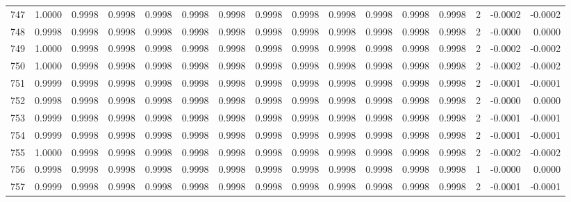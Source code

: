 \begin{tabular}{lrrrrrrrrrrrrrrr}
747 &      1.0000 &  0.9998 &  0.9998 &  0.9998 &  0.9998 &  0.9998 &  0.9998 &  0.9998 &  0.9998 &  0.9998 &   0.9998 &     0.9998 &      2 &                   -0.0002 &                    -0.0002 \\
748 &      0.9998 &  0.9998 &  0.9998 &  0.9998 &  0.9998 &  0.9998 &  0.9998 &  0.9998 &  0.9998 &  0.9998 &   0.9998 &     0.9998 &      2 &                   -0.0000 &                     0.0000 \\
749 &      1.0000 &  0.9998 &  0.9998 &  0.9998 &  0.9998 &  0.9998 &  0.9998 &  0.9998 &  0.9998 &  0.9998 &   0.9998 &     0.9998 &      2 &                   -0.0002 &                    -0.0002 \\
750 &      1.0000 &  0.9998 &  0.9998 &  0.9998 &  0.9998 &  0.9998 &  0.9998 &  0.9998 &  0.9998 &  0.9998 &   0.9998 &     0.9998 &      2 &                   -0.0002 &                    -0.0002 \\
751 &      0.9999 &  0.9998 &  0.9998 &  0.9998 &  0.9998 &  0.9998 &  0.9998 &  0.9998 &  0.9998 &  0.9998 &   0.9998 &     0.9998 &      2 &                   -0.0001 &                    -0.0001 \\
752 &      0.9998 &  0.9998 &  0.9998 &  0.9998 &  0.9998 &  0.9998 &  0.9998 &  0.9998 &  0.9998 &  0.9998 &   0.9998 &     0.9998 &      2 &                   -0.0000 &                     0.0000 \\
753 &      0.9999 &  0.9998 &  0.9998 &  0.9998 &  0.9998 &  0.9998 &  0.9998 &  0.9998 &  0.9998 &  0.9998 &   0.9998 &     0.9998 &      2 &                   -0.0001 &                    -0.0001 \\
754 &      0.9999 &  0.9998 &  0.9998 &  0.9998 &  0.9998 &  0.9998 &  0.9998 &  0.9998 &  0.9998 &  0.9998 &   0.9998 &     0.9998 &      2 &                   -0.0001 &                    -0.0001 \\
755 &      1.0000 &  0.9998 &  0.9998 &  0.9998 &  0.9998 &  0.9998 &  0.9998 &  0.9998 &  0.9998 &  0.9998 &   0.9998 &     0.9998 &      2 &                   -0.0002 &                    -0.0002 \\
756 &      0.9998 &  0.9998 &  0.9998 &  0.9998 &  0.9998 &  0.9998 &  0.9998 &  0.9998 &  0.9998 &  0.9998 &   0.9998 &     0.9998 &      1 &                   -0.0000 &                     0.0000 \\
757 &      0.9999 &  0.9998 &  0.9998 &  0.9998 &  0.9998 &  0.9998 &  0.9998 &  0.9998 &  0.9998 &  0.9998 &   0.9998 &     0.9998 &      2 &                   -0.0001 &                    -0.0001 \\

\end{tabular}
